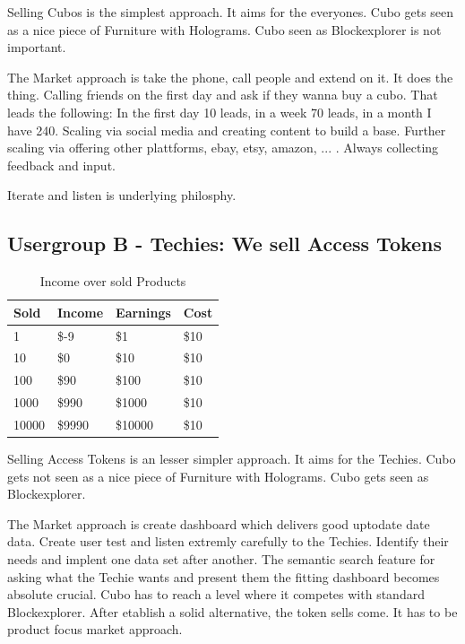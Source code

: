 \documentclass{report}
\begin{document}
Selling Cubos is the simplest approach.
It aims for the everyones.
Cubo gets seen as a nice piece of Furniture with Holograms.
Cubo seen as Blockexplorer is not important.

The Market approach is take the phone, call people and extend on it.
It does the thing.
Calling friends on the first day and ask if they wanna buy a cubo.
That leads the following: In the first day 10 leads, in a week 70 leads, in a month I have 240.
Scaling via social media and creating content to build a base.
Further scaling via offering other plattforms, ebay, etsy, amazon, ... .
Always collecting feedback and input.

Iterate and listen is underlying philosphy.

\newpage

\subsection{Usergroup B - Techies: We sell Access Tokens}
\begin{table}[htp]
	\centering
	\captionsetup{justification=raggedright}
	\caption{Income over sold Products}
	\begin{tabular}{|p{2cm}|p{2cm}|p{2cm}|p{2cm}|}
		\hline
		\textbf{Sold} & \textbf{Income} & \textbf{Earnings} & \textbf{Cost} \\
		\hline
		1             & \$-9            & \$1               & \$10          \\
		\hline
		10            & \$0             & \$10              & \$10          \\
		\hline
		100           & \$90            & \$100             & \$10          \\
		\hline
		1000          & \$990           & \$1000            & \$10          \\
		\hline
		10000         & \$9990          & \$10000           & \$10          \\
		\hline
	\end{tabular}
\end{table}

Selling Access Tokens is an lesser simpler approach.
It aims for the Techies.
Cubo gets not seen as a nice piece of Furniture with Holograms.
Cubo gets seen as Blockexplorer.

The Market approach is create dashboard which delivers good uptodate date data.
Create user test and listen extremly carefully to the Techies.
Identify their needs and implent one data set after another.
The semantic search feature for asking what the Techie wants and present them the fitting dashboard becomes absolute crucial.
Cubo has to reach a level where it competes with standard Blockexplorer.
After etablish a solid alternative, the token sells come. It has to be product focus market approach.
\end{document}
